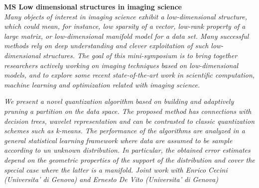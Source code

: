   \noindent\textbf{MS Low dimensional structures in imaging science}\\
  \textit{Many objects of interest in imaging science exhibit a low-dimensional structure, which could mean, for instance, low sparsity of a vector, low-rank property of a large matrix, or low-dimensional manifold model for a data set. Many successful methods rely on deep understanding and clever exploitation of such low-dimensional structures. The goal of this mini-symposium is to bring together researchers actively working on imaging techniques based on low-dimensional models, and to explore some recent state-of-the-art work in scientific computation, machine learning and optimization related with imaging science.} \\
    
  \begin{multicols}{2}
      \textit{We present a novel quantization algorithm based on building and adaptively pruning a partition on the data space. The proposed method has connections with decision trees, wavelet representation and can be contrasted to classic quantization schemes such as k-means.  The performance of the algorithms are analyzed in a general statistical learning framework where data are assumed to be sample according to un unknown distribution. In particular, the obtained error estimates depend on the geometric properties of the support of the distribution and cover the special case where the latter is a manifold. Joint work with Enrico Cecini  (Universita’ di Genova) and Ernesto De Vito  (Universita’ di Genova)}\\
\\ 
        \\
        \\\\
\\

\end{multicols}
